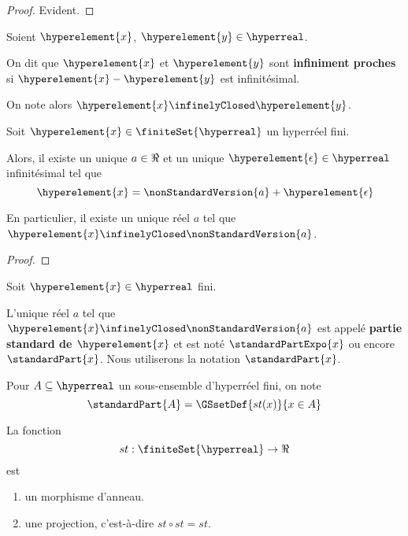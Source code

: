 \ifdefined\outputproof
\begin{proof}
	Evident.
\end{proof}
\fi

\begin{definition} 
	Soient $\hyperelement{x}$, $\hyperelement{y} \in \hyperreal$.

	On dit que $\hyperelement{x}$ et $\hyperelement{y}$ sont \textbf{infiniment
	proches} si $\hyperelement{x} - \hyperelement{y}$ est infinitésimal.

	On note alors $\hyperelement{x} \infinelyClosed \hyperelement{y}$.
\end{definition}

\begin{proposition}
	Soit $\hyperelement{x} \in \finiteSet{\hyperreal}$ un hyperréel fini.

	Alors, il existe un unique $a \in \real$ et un unique
	$\hyperelement{\epsilon} \in \hyperreal$
	infinitésimal tel que
	\begin{equation}
		\hyperelement{x} = \nonStandardVersion{a} +
		\hyperelement{\epsilon}
	\end{equation}

	En particulier, il existe un unique réel $a$ tel que $\hyperelement{x}
	\infinelyClosed \nonStandardVersion{a}$.
\end{proposition}

\ifdefined\outputproof
\begin{proof}

\end{proof}
\fi

\begin{definition} 
	Soit $\hyperelement{x} \in \hyperreal$ fini.

	L'unique réel $a$ tel que $\hyperelement{x} \infinelyClosed
	\nonStandardVersion{a}$ est appelé \textbf{partie standard de
		$\hyperelement{x}$} et est noté $\standardPartExpo{x}$ ou encore
		$\standardPart{x}$. Nous utiliserons la notation $\standardPart{x}$.
\end{definition}

\begin{notation}
	Pour $A \subseteq \hyperreal$ un sous-ensemble d'hyperréel fini, on note
	\begin{equation}
		\standardPart{A} = \GSsetDef{st(x)}{x \in A}
	\end{equation}
\end{notation}

\begin{proposition}
	La fonction
	\begin{equation}
		st : \finiteSet{\hyperreal} \rightarrow \real
	\end{equation}
	est
	\begin{enumerate}
		\item un morphisme d'anneau.
		\item une projection, c'est-à-dire $st \circ st = st$.
	\end{enumerate}
\end{proposition}

